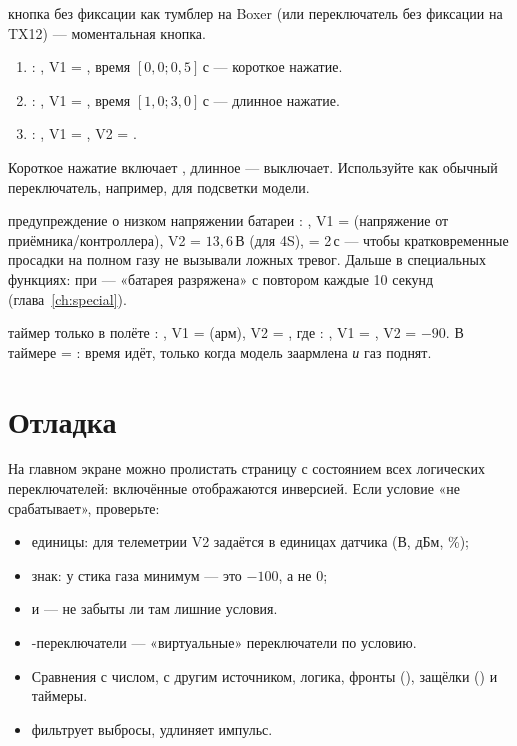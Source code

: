 \begin{recipe}{кнопка без фиксации как тумблер}
 на Boxer (или переключатель без фиксации на TX12) --- моментальная кнопка.
\begin{enumerate}
  \item {}: , V1 = , время $[0{,}0; 0{,}5]$\,с --- короткое нажатие.
  \item {}: , V1 = , время $[1{,}0; 3{,}0]$\,с --- длинное нажатие.
  \item {}: , V1 = , V2 = .
\end{enumerate}
Короткое нажатие включает , длинное --- выключает. Используйте  как обычный
переключатель, например, для подсветки модели.
\end{recipe}

\begin{recipe}{предупреждение о низком напряжении батареи}
: , V1 =  (напряжение от приёмника/контроллера), V2 = $13{,}6$\,В
(для 4S),  = 2\,с --- чтобы кратковременные просадки на полном газу не вызывали
ложных тревог. Дальше в специальных функциях: при  --- 
«батарея разряжена» с повтором каждые 10 секунд (глава~\ref{ch:special}).
\end{recipe}

\begin{recipe}{таймер только в полёте}
: , V1 =  (арм), V2 = , где : ,
V1 = , V2 = $-90$. В таймере  = : время идёт, только когда
модель заармлена \emph{и} газ поднят.
\end{recipe}

\section{Отладка}

На главном экране можно пролистать страницу с состоянием всех логических переключателей:
включённые отображаются инверсией. Если условие «не срабатывает», проверьте:
\begin{itemize}
  \item единицы: для телеметрии V2 задаётся в единицах датчика (В, дБм, \%);
  \item знак: у стика газа минимум --- это $-100$, а не 0;
  \item {} и  --- не забыты ли там лишние условия.
\end{itemize}

\begin{summary}
\begin{itemize}
  \item {}-переключатели --- «виртуальные» переключатели по условию.
  \item Сравнения с числом, с другим источником, логика, фронты (), защёлки
        () и таймеры.
  \item {} фильтрует выбросы,  удлиняет импульс.
\end{itemize}
\end{summary}
